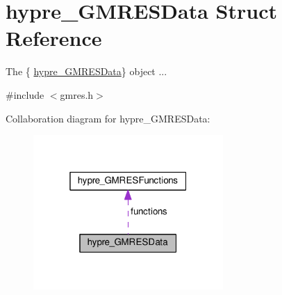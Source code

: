 \hypertarget{structhypre__GMRESData}{}\section{hypre\+\_\+\+G\+M\+R\+E\+S\+Data Struct Reference}
\label{structhypre__GMRESData}


The \{ \hyperlink{structhypre__GMRESData}{hypre\+\_\+\+G\+M\+R\+E\+S\+Data}\} object ...  




{\ttfamily \#include $<$gmres.\+h$>$}



Collaboration diagram for hypre\+\_\+\+G\+M\+R\+E\+S\+Data\+:
\nopagebreak
\begin{figure}[H]
\begin{center}
\leavevmode
\includegraphics[width=205pt]{structhypre__GMRESData__coll__graph}
\end{center}
\end{figure}
